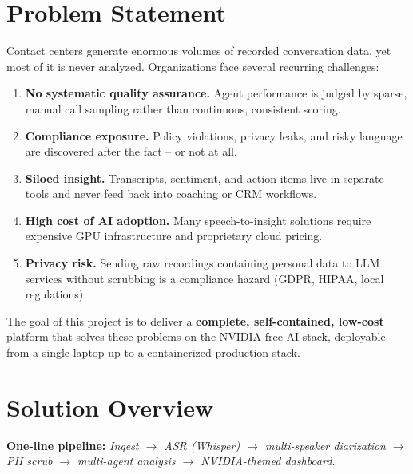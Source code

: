 \documentclass[11pt,a4paper]{article}
\begin{document}
\section{Problem Statement}

Contact centers generate enormous volumes of recorded conversation data, yet most of it
is never analyzed. Organizations face several recurring challenges:

\begin{enumerate}
  \item \textbf{No systematic quality assurance.} Agent performance is judged by sparse,
        manual call sampling rather than continuous, consistent scoring.
  \item \textbf{Compliance exposure.} Policy violations, privacy leaks, and risky language
        are discovered after the fact -- or not at all.
  \item \textbf{Siloed insight.} Transcripts, sentiment, and action items live in separate
        tools and never feed back into coaching or CRM workflows.
  \item \textbf{High cost of AI adoption.} Many speech-to-insight solutions require
        expensive GPU infrastructure and proprietary cloud pricing.
  \item \textbf{Privacy risk.} Sending raw recordings containing personal data to LLM
        services without scrubbing is a compliance hazard (GDPR, HIPAA, local regulations).
\end{enumerate}

The goal of this project is to deliver a \textbf{complete, self-contained, low-cost}
platform that solves these problems on the NVIDIA free AI stack, deployable from a single
laptop up to a containerized production stack.

\section{Solution Overview}

\begin{note}
\textbf{One-line pipeline:} \emph{Ingest $\rightarrow$ ASR (Whisper) $\rightarrow$
multi-speaker diarization $\rightarrow$ PII scrub $\rightarrow$ multi-agent analysis
$\rightarrow$ NVIDIA-themed dashboard.}
\end{note}
\end{document}
